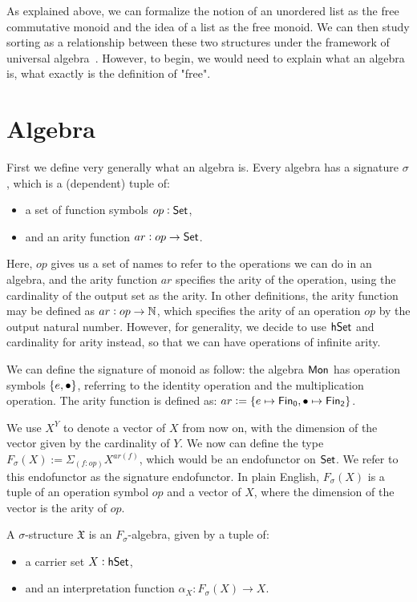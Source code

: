 \label{sec:universal-algebra}

As explained above, we can formalize the notion of an unordered list
as the free commutative monoid and the idea of a list as the free
monoid. We can then study sorting as a relationship between these
two structures under the framework of universal algebra~\cite{birkhoffStructureAbstractAlgebras1935}.
However, to begin, we would need to explain what an algebra is,
what exactly is the definition of "free".

\section{Algebra}
First we define very generally what an algebra is. Every algebra
has a signature $\sigma$, which is a (dependent) tuple of:
\begin{itemize}
    \item a set of function symbols $op : \mathsf{Set}$,
    \item and an arity function $ar : op \to \mathsf{Set}$.
\end{itemize}

Here, $op$ gives us a set of names to refer to the operations we can do
in an algebra, and the arity function $ar$ specifies the arity of the operation,
using the cardinality of the output set as the arity. In other definitions,
the arity function may be defined as $ar : op \to \mathbb{N}$, which specifies
the arity of an operation $op$ by the output natural number. However,
for generality, we decide to use $\mathsf{hSet}$ and cardinality for arity instead,
so that we can have operations of infinite arity. 

\begin{example}
We can define the signature of monoid as follow: the algebra $\mathsf{Mon}$
has operation symbols $\{ e, \mathbin{\bullet} \}$, referring to the identity operation
and the multiplication operation. The arity function is defined as:
$ar := \{ e \mapsto \Fin[0], \mult \mapsto \Fin[2] \}$.
\end{example}

We use $X^Y$ to denote a vector of $X$ from now on, with the dimension of
the vector given by the cardinality of $Y$. We now can define the type
$F_\sigma(X) := \Sigma_{(f: op)}X^{ar(f)}$, which would be an endofunctor
on $\mathsf{Set}$. We refer to this endofunctor as the signature endofunctor.
In plain English, $F_\sigma(X)$ is a tuple of an operation symbol $op$
and a vector of $X$, where the dimension of the vector is the arity of $op$.

\begin{definition}
    A $\sigma$-structure $\mathfrak{X}$ is an $F_\sigma$-algebra, given by a tuple
    of:
    \begin{itemize}
        \item a carrier set $X : \mathsf{hSet}$,
        \item and an interpretation function $\alpha_X : F_\sigma(X) \to X$.
    \end{itemize}
\end{definition}

